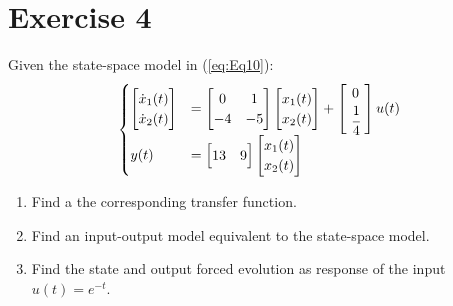 \documentclass[a4paper,11pt]{article}
\begin{document}
\section*{Exercise 4} 
Given the state-space model in (\ref{eq:Eq10}): \vskip-0.4cm
\begin{align}
\begin{cases}
\begin{bmatrix}
\dot{x}_1(t)\\
\dot{x}_2(t)
\end{bmatrix}
& =
\begin{bmatrix}
0 & 1\\
-4 & -5 
\end{bmatrix}
\begin{bmatrix}
{x}_1(t)\\
{x}_2(t)
\end{bmatrix}
+
\begin{bmatrix}
\ 0 \ \\
\ \cfrac{1}{4}\ 
\end{bmatrix}
u(t) \\
y(t) & =
\begin{bmatrix}
13 & 9
\end{bmatrix}
\begin{bmatrix}
{x}_1(t)\\
{x}_2(t)
\end{bmatrix}
\end{cases}
\label{eq:Eq16}
\end{align}

\begin{enumerate}
\item Find a the corresponding transfer function.
\item Find an input-output model equivalent to the state-space model. 
\item Find the state and output forced evolution as response of the input $ u(t)=e^{-t}$.
\end{enumerate}
\end{document}
